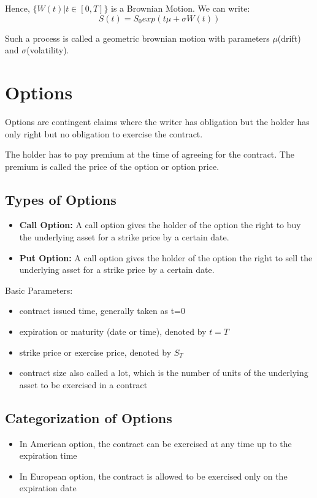 \documentclass{report}
\begin{document}
Hence, $\{W(t) | t\in [0,T]\}$ is a Brownian Motion.
We can write:
\begin{equation}
    S(t) = S_0exp(t\mu + \sigma W(t))
\end{equation}

Such a process is called a geometric brownian motion with parameters $\mu$(drift) and $\sigma$(volatility).


\section{Options}
Options are contingent claims where the writer has obligation but the holder has only right but no obligation to exercise the contract.


The holder has to pay premium at the time of agreeing for the contract. The premium is called the price of the option or option price.


\subsection{Types of Options}
\begin{itemize}
    \item \textbf{Call Option:} A call option gives the holder of the option the right to buy the underlying asset for a strike price by a certain date.
    \item \textbf{Put Option:} A call option gives the holder of the option the right to sell the underlying asset for a strike price by a certain date.
\end{itemize}

Basic Parameters:
\begin{itemize}
    \item contract issued time, generally taken as t=0
    \item expiration or maturity (date or time), denoted by $t=T$
    \item strike price or exercise price, denoted by $S_T$
    \item contract size also called a lot, which is the number of units of the underlying asset to be exercised in a contract
\end{itemize}


\subsection{Categorization of Options}
\begin{itemize}
    \item In American option, the contract can be exercised at any time up to the expiration time
    \item In European option, the contract is allowed to be exercised only on the expiration date
\end{itemize}
\end{document}
